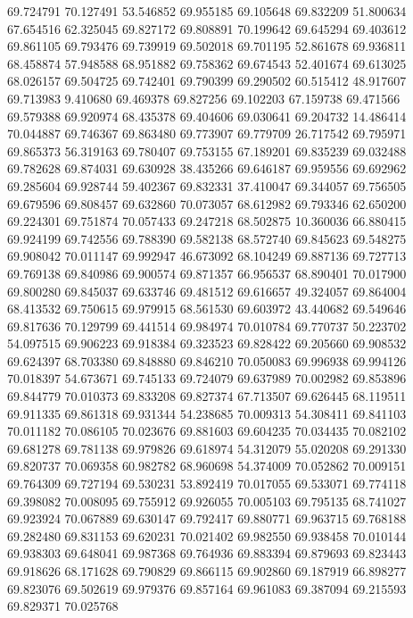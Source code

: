 69.724791
70.127491
53.546852
69.955185
69.105648
69.832209
51.800634
67.654516
62.325045
69.827172
69.808891
70.199642
69.645294
69.403612
69.861105
69.793476
69.739919
69.502018
69.701195
52.861678
69.936811
68.458874
57.948588
68.951882
69.758362
69.674543
52.401674
69.613025
68.026157
69.504725
69.742401
69.790399
69.290502
60.515412
48.917607
69.713983
9.410680
69.469378
69.827256
69.102203
67.159738
69.471566
69.579388
69.920974
68.435378
69.404606
69.030641
69.204732
14.486414
70.044887
69.746367
69.863480
69.773907
69.779709
26.717542
69.795971
69.865373
56.319163
69.780407
69.753155
67.189201
69.835239
69.032488
69.782628
69.874031
69.630928
38.435266
69.646187
69.959556
69.692962
69.285604
69.928744
59.402367
69.832331
37.410047
69.344057
69.756505
69.679596
69.808457
69.632860
70.073057
68.612982
69.793346
62.650200
69.224301
69.751874
70.057433
69.247218
68.502875
10.360036
66.880415
69.924199
69.742556
69.788390
69.582138
68.572740
69.845623
69.548275
69.908042
70.011147
69.992947
46.673092
68.104249
69.887136
69.727713
69.769138
69.840986
69.900574
69.871357
66.956537
68.890401
70.017900
69.800280
69.845037
69.633746
69.481512
69.616657
49.324057
69.864004
68.413532
69.750615
69.979915
68.561530
69.603972
43.440682
69.549646
69.817636
70.129799
69.441514
69.984974
70.010784
69.770737
50.223702
54.097515
69.906223
69.918384
69.323523
69.828422
69.205660
69.908532
69.624397
68.703380
69.848880
69.846210
70.050083
69.996938
69.994126
70.018397
54.673671
69.745133
69.724079
69.637989
70.002982
69.853896
69.844779
70.010373
69.833208
69.827374
67.713507
69.626445
68.119511
69.911335
69.861318
69.931344
54.238685
70.009313
54.308411
69.841103
70.011182
70.086105
70.023676
69.881603
69.604235
70.034435
70.082102
69.681278
69.781138
69.979826
69.618974
54.312079
55.020208
69.291330
69.820737
70.069358
60.982782
68.960698
54.374009
70.052862
70.009151
69.764309
69.727194
69.530231
53.892419
70.017055
69.533071
69.774118
69.398082
70.008095
69.755912
69.926055
70.005103
69.795135
68.741027
69.923924
70.067889
69.630147
69.792417
69.880771
69.963715
69.768188
69.282480
69.831153
69.620231
70.021402
69.982550
69.938458
70.010144
69.938303
69.648041
69.987368
69.764936
69.883394
69.879693
69.823443
69.918626
68.171628
69.790829
69.866115
69.902860
69.187919
66.898277
69.823076
69.502619
69.979376
69.857164
69.961083
69.387094
69.215593
69.829371
70.025768
